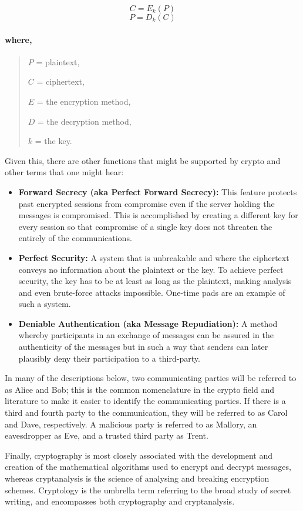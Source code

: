 \documentclass[british]{article}
\begin{document}
$$ C = E_k(P) $$
$$ P = D_k(C) $$

\paragraph{\textmd{where, }}
\begin{verse}
$P$ = plaintext,

$C$ = ciphertext,

$E$ = the encryption method,

$D$ = the decryption method,

$k$ = the key.
\end{verse}
Given this, there are other functions that might be supported by crypto
and other terms that one might hear:
\begin{itemize}
\item \textbf{Forward Secrecy (aka Perfect Forward Secrecy):} This feature
protects past encrypted sessions from compromise even if the server
holding the messages is compromised. This is accomplished by creating
a different key for every session so that compromise of a single key
does not threaten the entirely of the communications. 
\item \textbf{Perfect Security: }A system that is unbreakable and where
the ciphertext conveys no information about the plaintext or the key.
To achieve perfect security, the key has to be at least as long as
the plaintext, making analysis and even brute-force attacks impossible.
One-time pads are an example of such a system.
\item \textbf{Deniable Authentication (aka Message Repudiation): }A method
whereby participants in an exchange of messages can be assured in
the authenticity of the messages but in such a way that senders can
later plausibly deny their participation to a third-party.
\end{itemize}
In many of the descriptions below, two communicating parties will
be referred to as Alice and Bob; this is the common nomenclature in
the crypto field and literature to make it easier to identify the
communicating parties. If there is a third and fourth party to the
communication, they will be referred to as Carol and Dave, respectively.
A malicious party is referred to as Mallory, an eavesdropper as Eve,
and a trusted third party as Trent.

Finally, cryptography is most closely associated with the development
and creation of the mathematical algorithms used to encrypt and decrypt
messages, whereas cryptanalysis is the science of analysing and breaking
encryption schemes. Cryptology is the umbrella term referring to the
broad study of secret writing, and encompasses both cryptography and
cryptanalysis.
\end{document}
